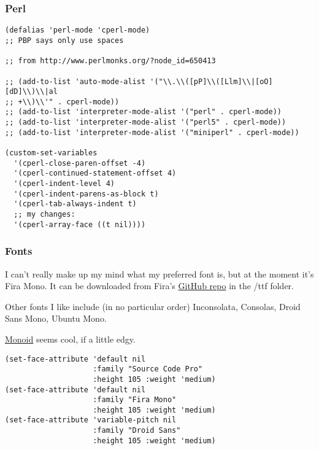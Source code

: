 \documentclass[11pt]{article}
\begin{document}
\subsubsection{Perl}
\label{sec-1-2-4}

\begin{verbatim}
(defalias 'perl-mode 'cperl-mode)
;; PBP says only use spaces

;; from http://www.perlmonks.org/?node_id=650413

;; (add-to-list 'auto-mode-alist '("\\.\\([pP]\\([Llm]\\|[oO][dD]\\)\\|al
;; +\\)\\'" . cperl-mode))
;; (add-to-list 'interpreter-mode-alist '("perl" . cperl-mode))
;; (add-to-list 'interpreter-mode-alist '("perl5" . cperl-mode))
;; (add-to-list 'interpreter-mode-alist '("miniperl" . cperl-mode))

(custom-set-variables
  '(cperl-close-paren-offset -4)
  '(cperl-continued-statement-offset 4)
  '(cperl-indent-level 4)
  '(cperl-indent-parens-as-block t)
  '(cperl-tab-always-indent t)
  ;; my changes:
  '(cperl-array-face ((t nil))))
\end{verbatim}

\subsubsection{Fonts}
\label{sec-1-2-5}

I can't really make up my mind what my preferred font is, but at the moment it's Fira Mono.
It can be downloaded from Fira's \href{https://github.com/mozilla/Fira}{GitHub repo} in the /ttf folder.

Other fonts I like include (in no particular order) Inconsolata, Consolas, Droid Sans Mono, Ubuntu Mono.

\href{http://larsenwork.com/monoid/}{Monoid} seems cool, if a little edgy.

\begin{verbatim}
(set-face-attribute 'default nil
                    :family "Source Code Pro"
                    :height 105 :weight 'medium)
(set-face-attribute 'default nil
                    :family "Fira Mono"
                    :height 105 :weight 'medium)
(set-face-attribute 'variable-pitch nil
                    :family "Droid Sans"
                    :height 105 :weight 'medium)
\end{verbatim}
\end{document}
